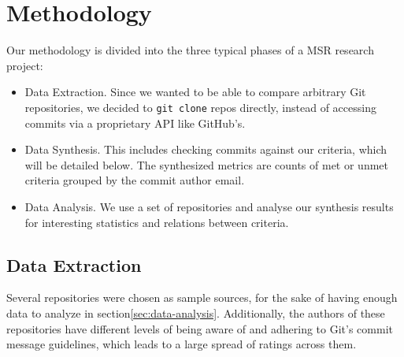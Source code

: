 \section{Methodology}
\label{sec:methodology}

Our methodology is divided into the three typical phases of a MSR research project:


\begin{itemize}
  \item Data Extraction. Since we wanted to be able to compare arbitrary Git repositories, we decided to \texttt{git clone} repos directly, instead of accessing commits via a proprietary API like GitHub's.
  \item Data Synthesis. This includes checking commits against our criteria, which will be detailed below. The synthesized metrics are counts of met or unmet criteria grouped by the commit author email.
  \item Data Analysis. We use a set of repositories and analyse our synthesis results for interesting statistics and relations between criteria.
\end{itemize}


\subsection{Data Extraction}
\label{sec:data-extraction}

Several repositories were chosen as sample sources, for the sake of having enough data to analyze in section\ref{sec:data-analysis}. Additionally, the authors of these repositories have different levels of being aware of and adhering to Git's commit message guidelines\cite{OffGuide}, which leads to a large spread of ratings across them.


